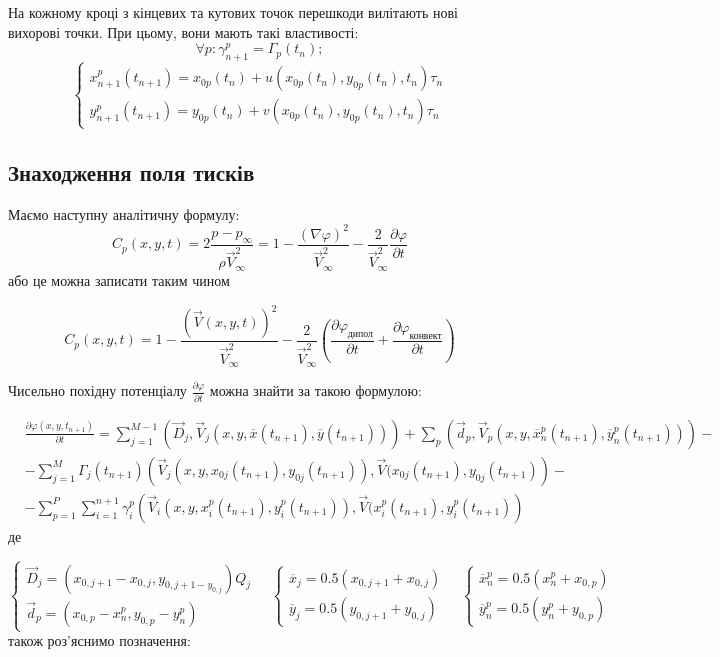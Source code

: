 \documentclass[a4paper,12pt]{article}
\begin{document}
	На кожному кроці з кінцевих та кутових точок перешкоди вилітають нові вихорові точки. При цьому, вони мають такі властивості:
	\[
	\forall p: \gamma_{n+1}^{p} = \Gamma_p(t_n);
	\]
	\begin{equation*}
	\begin{cases}
	x_{n+1}^{p}(t_{n+1}) = x_{0p}(t_n) + u(x_{0p}(t_n), y_{0p}(t_n), t_n)\tau_n
	\\
	y_{n+1}^{p}(t_{n+1}) = y_{0p}(t_n) + v(x_{0p}(t_n), y_{0p}(t_n), t_n)\tau_n
	\end{cases}
	\end{equation*}
	
	\subsection{Знаходження поля тисків}
	
	Маємо наступну аналітичну формулу:
	\[
		C_p(x,y,t) = 2 \frac{p - p_\infty}{\rho \vec{V}_\infty^2} = 1 - \frac{(\nabla \varphi)^2}{\vec{V}_\infty^2} - \frac{2}{\vec{V}_\infty^2} \frac{\partial \varphi}{\partial t}
	\]
	або це можна записати таким чином
	
	\[
		C_p(x,y,t) = 1 - \frac{\left( \vec{V}(x,y,t) \right)^2}{\vec{V}_\infty^2} - \frac{2}{\vec{V}_\infty^2} \left(\frac{\partial \varphi_{\text{дипол}}}{\partial t} + \frac{\partial \varphi_{\text{конвект}}}{\partial t} \right)
	\]
	
	Чисельно похідну потенціалу $\frac{\partial \varphi}{\partial t}$ можна знайти за такою формулою:
	
	\begin{align}
		&\frac{\partial \varphi(x,y,t_{n+1})}{\partial t} = \sum_{j=1}^{M-1} \left( \vec{D}_j, \vec{V}_j \left(x,y,\overline{x}(t_{n+1}), \overline{y}(t_{n+1}) \right) \right) + \sum_p \left( \vec{d}_p, \vec{V}_p \left(x,y,\overline{x}^p_n(t_{n+1}), \overline{y}^p_n(t_{n+1}) \right)  \right) - \nonumber \\
		&- \sum_{j=1}^M \Gamma_j (t_{n+1}) \left(
			\vec{V}_j \left( x,y,x_{0j}(t_{n+1}), y_{0j}(t_{n+1}) \right), \vec{V} (x_{0j}(t_{n+1}), y_{0j}(t_{n+1}) \right) -  \nonumber \\
		&- \sum_{p=1}^{P}\sum_{i=1}^{n+1} \gamma_i^p \left(
			\vec{V}_i \left( x,y, x_i^p(t_{n+1}), y_i^p(t_{n+1}) \right), \vec{V} (x_i^p(t_{n+1}), y_i^p(t_{n+1})\right) \nonumber
	\end{align}
	де
	
	\[
	\begin{cases}
		\vec{D}_j = (x_{0,j+1} - x_{0,j}, y_{0,j+1 - y_{0,j}}) Q_j \\
		\vec{d}_p = (x_{0,p} - x_{n}^p, y_{0,p} - y_{n}^p)
	\end{cases} \quad
	\begin{cases}
		\overline{x}_j = 0.5(x_{0,j+1} + x_{0,j}) \\
		\overline{y}_j = 0.5(y_{0,j+1} + y_{0,j})
	\end{cases}	\quad
	\begin{cases}
		\overline{x}_n^p = 0.5(x_n^p + x_{0,p}) \\
		\overline{y}_n^p = 0.5(y_n^p + y_{0,p}) 
	\end{cases}	
	\]
	також роз'яснимо позначення:
	
\end{document}
